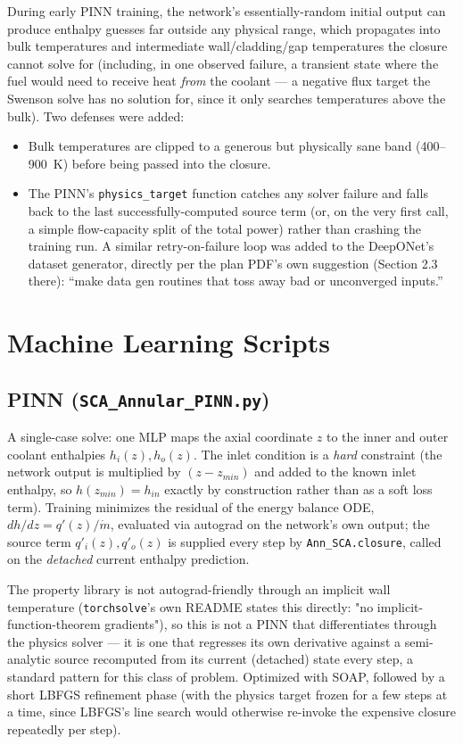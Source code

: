 \documentclass[11pt]{article}
\begin{document}
During early PINN training, the network's essentially-random initial
output can produce enthalpy guesses far outside any physical range, which
propagates into bulk temperatures and intermediate wall/cladding/gap
temperatures the closure cannot solve for (including, in one observed
failure, a transient state where the fuel would need to receive heat
\emph{from} the coolant --- a negative flux target the Swenson solve has
no solution for, since it only searches temperatures above the bulk).
Two defenses were added:
\begin{itemize}
\item Bulk temperatures are clipped to a generous but physically sane band
(400--900~K) before being passed into the closure.
\item The PINN's \texttt{physics\_target} function catches any solver
failure and falls back to the last successfully-computed source term (or,
on the very first call, a simple flow-capacity split of the total power)
rather than crashing the training run. A similar retry-on-failure loop was
added to the DeepONet's dataset generator, directly per the plan PDF's own
suggestion (Section 2.3 there): ``make data gen routines that toss away
bad or unconverged inputs.''
\end{itemize}

\section{Machine Learning Scripts}
\label{sec:ml}

\subsection{PINN (\texttt{SCA\_Annular\_PINN.py})}

A single-case solve: one MLP maps the axial coordinate $z$ to the inner and
outer coolant enthalpies $h_i(z), h_o(z)$. The inlet condition is a
\emph{hard} constraint (the network output is multiplied by $(z - z_{min})$
and added to the known inlet enthalpy, so $h(z_{min}) = h_{in}$ exactly by
construction rather than as a soft loss term). Training minimizes the
residual of the energy balance ODE, $dh/dz = q'(z)/\dot m$, evaluated via
autograd on the network's own output; the source term $q'_i(z), q'_o(z)$ is
supplied every step by \texttt{Ann\_SCA.closure}, called on the
\emph{detached} current enthalpy prediction.

The property library is not autograd-friendly through an implicit wall
temperature (\texttt{torchsolve}'s own README states this directly: "no
implicit-function-theorem gradients"), so this is not a PINN that
differentiates through the physics solver --- it is one that regresses its
own derivative against a semi-analytic source recomputed from its current
(detached) state every step, a standard pattern for this class of problem.
Optimized with SOAP, followed by a short LBFGS refinement phase (with the
physics target frozen for a few steps at a time, since LBFGS's line search
would otherwise re-invoke the expensive closure repeatedly per step).
\end{document}

